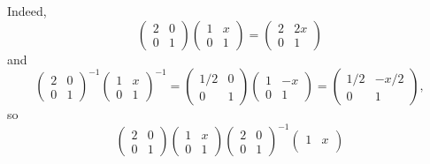 \begin{example}
\begin{thmenum}
    Indeed,
    \begin{equation*}
      \begin{pmatrix}
        2 & 0 \\
        0 & 1
      \end{pmatrix}
      \begin{pmatrix}
        1 & x \\
        0 & 1
      \end{pmatrix}
      =
      \begin{pmatrix}
        2 & 2x \\
        0 & 1
      \end{pmatrix}
    \end{equation*}
    and
    \begin{equation*}
      \begin{pmatrix}
        2 & 0 \\
        0 & 1
      \end{pmatrix}^{-1}
      \begin{pmatrix}
        1 & x \\
        0 & 1
      \end{pmatrix}^{-1}
      =
      \begin{pmatrix}
        1/2 & 0 \\
        0   & 1
      \end{pmatrix}
      \begin{pmatrix}
        1 & -x \\
        0 & 1
      \end{pmatrix}
      =
      \begin{pmatrix}
        1/2 & -x/2 \\
        0   & 1
      \end{pmatrix},
    \end{equation*}
    so
    \begin{equation*}
      \begin{pmatrix}
        2 & 0 \\
        0 & 1
      \end{pmatrix}
      \begin{pmatrix}
        1 & x \\
        0 & 1
      \end{pmatrix}
      \begin{pmatrix}
        2 & 0 \\
        0 & 1
      \end{pmatrix}^{-1}
      \begin{pmatrix}
        1 & x \\

\end{pmatrix}
\end{equation*}
\end{thmenum}
\end{example}
